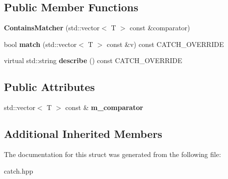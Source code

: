 \subsection*{Public Member Functions}
\begin{DoxyCompactItemize}
\item 
\mbox{\label{structCatch_1_1Matchers_1_1Vector_1_1ContainsMatcher_ad8e92c8399be6dce75bb5702cdfab700}} 
{\bfseries Contains\+Matcher} (std\+::vector$<$ T $>$ const \&comparator)
\item 
\mbox{\label{structCatch_1_1Matchers_1_1Vector_1_1ContainsMatcher_aba81516816a6796124dd4fe4843e7284}} 
bool {\bfseries match} (std\+::vector$<$ T $>$ const \&v) const C\+A\+T\+C\+H\+\_\+\+O\+V\+E\+R\+R\+I\+DE
\item 
\mbox{\label{structCatch_1_1Matchers_1_1Vector_1_1ContainsMatcher_add1a31f049cec89f980424ecdb7027ac}} 
virtual std\+::string {\bfseries describe} () const C\+A\+T\+C\+H\+\_\+\+O\+V\+E\+R\+R\+I\+DE
\end{DoxyCompactItemize}
\subsection*{Public Attributes}
\begin{DoxyCompactItemize}
\item 
\mbox{\label{structCatch_1_1Matchers_1_1Vector_1_1ContainsMatcher_a83d051166e4ed0d535219ad6ee99abb2}} 
std\+::vector$<$ T $>$ const  \& {\bfseries m\+\_\+comparator}
\end{DoxyCompactItemize}
\subsection*{Additional Inherited Members}


The documentation for this struct was generated from the following file\+:\begin{DoxyCompactItemize}
\item 
catch.\+hpp\end{DoxyCompactItemize}
